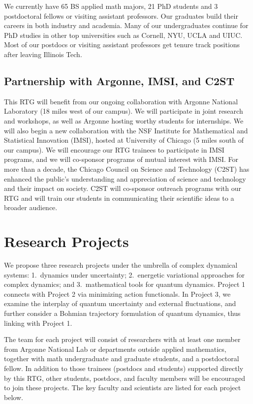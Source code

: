 \documentclass[11pt]{NSFamsart}
\newcommand{\numUG}{65\xspace}
\newcommand{\numPhD}{21\xspace}
\newcommand{\numPostDoc}{3\xspace}
\begin{document}
We currently have \numUG BS applied math majors, \numPhD PhD students and \numPostDoc postdoctoral fellows or visiting assistant professors. Our graduates build their careers in  both industry  and academia. Many of our undergraduates continue for PhD studies in other top universities such as Cornell, NYU, UCLA and UIUC. Most of our postdocs or visiting assistant professors get tenure track positions after leaving Illinois Tech.


\subsection*{Partnership with Argonne, IMSI, and C2ST}
This RTG will benefit from our ongoing collaboration with Argonne National Laboratory (18 miles west of our campus). We will participate in joint research and workshops, as well as Argonne hosting worthy students for internships.  We will also begin a new collaboration with the NSF Institute for Mathematical and Statistical Innovation (IMSI), hosted at University of Chicago (5 miles south of our campus). We will encourage our RTG trainees to participate in IMSI programs, and we will co-sponsor programs of mutual interest with IMSI.  For more than a decade, the Chicago Council on Science and Technology (C2ST) has enhanced the public’s understanding and appreciation of science and technology and their impact on society. C2ST will co-sponsor outreach programs with our RTG and will train our students in communicating their scientific ideas to a broader audience.
 


\section{Research Projects } \label{sec:researchproblems}

We propose three research projects under the umbrella of complex dynamical systems: 1.\ dynamics under uncertainty; 2.\  energetic variational approaches for complex dynamics; and 3.\ mathematical tools for quantum dynamics. Project 1 connects with Project 2 via minimizing action functionals. In Project 3, we examine the interplay of quantum uncertainty and external fluctuations, and further consider a Bohmian trajectory formulation of quantum dynamics, thus linking with Project 1. 

The team for each project will consist of researchers with at least one member
from Argonne National Lab or departments outside applied mathematics, together with math undergraduate and graduate students, and a postdoctoral
fellow. In addition to those trainees (postdocs and students) supported directly by this RTG, other students, postdocs, and faculty members will be encouraged to join these projects.  The key faculty and scientists are listed for each project below.
\end{document}
